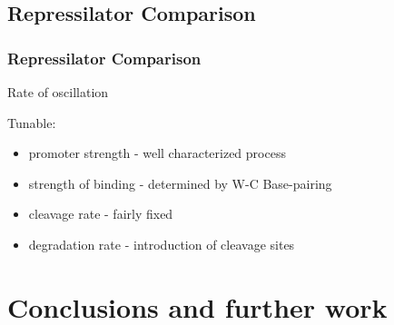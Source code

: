 \documentclass{beamer}
\begin{document}
\begin{frame}
\begin{columns}[T]
\begin{column}{0.4\textwidth}


    \end{column}    
  \end{columns}

\end{frame}

\subsection{Repressilator Comparison}
\begin{frame}
\frametitle{Repressilator Comparison}

Rate of oscillation 

Tunable:
\begin{itemize}
 \item promoter strength - well characterized process

 \item  strength of binding - determined by W-C Base-pairing

 \item  cleavage rate - fairly fixed 
 
 \item degradation rate - introduction of cleavage sites
\end{itemize}

\end{frame}


\section{Conclusions and further work}
\end{document}
